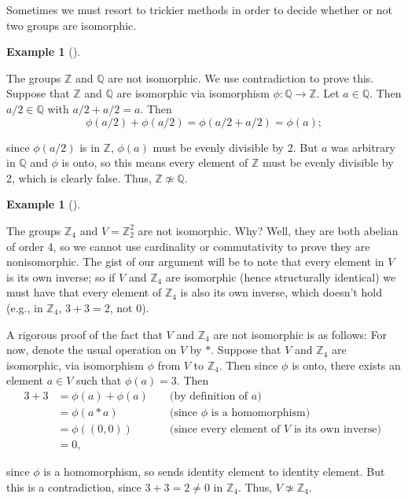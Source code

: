 \documentclass[10pt,]{book}
\theoremstyle{plain}
\theoremstyle{definition}
\theoremstyle{definition}
\theoremstyle{definition}
\newtheorem{example}[theorem]{Example}
\theoremstyle{definition}
\numberwithin{equation}{section}
\def\Z{\mathbb{Z}}
\def\Q{\mathbb{Q}}
\newcommand{\amp}{ & }
\begin{document}
    Sometimes we must resort to trickier methods in order to decide whether or not two groups are isomorphic.
\begin{example}[]\label{zq}

        The groups \(\Z\) and \(\Q\) are not isomorphic. We use contradiction to prove this. Suppose that \(\Z\) and \(\Q\) are isomorphic via isomorphism
        \(\phi :\Q \to \Z\). Let \(a\in \Q\). Then \(a/2 \in \Q\) with
        \(a/2 + a/2 =a\). Then
\begin{equation*}

          \phi(a/2)+\phi(a/2)=
          \phi(a/2+a/2)=\phi(a);
        
\end{equation*}

        since \(\phi(a/2)\) is in \(\Z\), \(\phi(a)\)
        must be evenly divisible by 2. But \(a\) was arbitrary in \(\Q\) and
        \(\phi\) is onto, so this means every element of \(\Z\) must be evenly
        divisible by 2, which is clearly false. Thus, \(\Z\not\simeq \Q\).
\end{example}
\begin{example}[]\label{x4nonunique}

        The groups \(\Z_4\) and \(V=\Z_2^2\) are not isomorphic. Why? Well, they are both abelian of order 4, so we cannot use cardinality or commutativity to prove they are nonisomorphic. The gist of our argument will be to note that every element in \(V\) is its own inverse; so if \(V\) and \(\Z_4\) are isomorphic (hence structurally identical) we must have that every element of \(\Z_4\) is also its own inverse, which doesn't hold (e.g., in \(\Z_4\), \(3+3=2\), not \(0\)).
\par

        A rigorous proof of the fact that \(V\) and \(\Z_4\) are not isomorphic is as follows: For now, denote the usual operation on \(V\) by \(*\). Suppose that \(V\) and \(\Z_4\) are isomorphic, via isomorphism \(\phi\) from \(V\) to \(\Z_4\). Then since \(\phi\) is onto, there exists an element \(a\in V\) such that \(\phi(a)=3\). Then
\begin{align*}
3+3\amp =\phi(a)+\phi(a)\amp \amp \text{ (by definition of \(a\)) }\\
\amp =\phi(a*a) \amp \amp \text{ (since \(\phi\) is a homomorphism) }\\
\amp =\phi((0,0)) \amp \amp \text{ (since every element of \(V\) is its own inverse) }\\
\amp =0, \amp \amp
\end{align*}

        since \(\phi\) is a homomorphism, so sends identity element to identity element. But this is a contradiction, since \(3+3=2\neq 0\) in \(\Z_4\). Thus, \(V\not\simeq \Z_4\).
\end{example}
\typeout{************************************************}
\typeout{************************************************}
\end{document}

